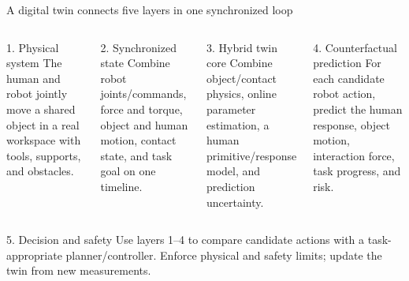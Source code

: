 \documentclass[aspectratio=169,11pt]{beamer}
\begin{document}
\begin{frame}{A digital twin connects five layers in one synchronized loop}
\begin{columns}[T,onlytextwidth]
\begin{block}{1. Physical system}
The human and robot jointly move a shared object in a real workspace with tools, supports, and obstacles.
\end{block}
\begin{block}{2. Synchronized state}
Combine robot joints/commands, force and torque, object and human motion, contact state, and task goal on one timeline.
\end{block}
\begin{block}{3. Hybrid twin core}
Combine object/contact physics, online parameter estimation, a human primitive/response model, and prediction uncertainty.
\end{block}
\begin{block}{4. Counterfactual prediction}
For each candidate robot action, predict the human response, object motion, interaction force, task progress, and risk.
\end{block}
\end{columns}
\begin{alertblock}{5. Decision and safety}
Use layers 1--4 to compare candidate actions with a task-appropriate planner/controller. Enforce physical and safety limits; update the twin from new measurements.
\end{alertblock}
\end{frame}
\end{document}
